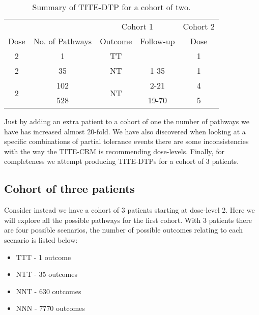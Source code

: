 \begin{table}[H]
	\centering
	\caption{Summary of TITE-DTP for a cohort of two.}
	\label{tab_tite-dtp:TITEDTP_c2_Sum}
	\begin{tabular}{ccccc}
		\hline
		\multicolumn{1}{l}{} &                 & \multicolumn{2}{c}{Cohort 1}    & Cohort 2 \\ 
		\cmidrule(l{3pt}r{3pt}){3-4} \cmidrule(l{3pt}r{3pt}){5-5}
		Dose                 & No. of Pathways & Outcome             & Follow-up & Dose     \\ \hline
		2                    & 1               & TT                  &           & 1        \\ \hline
		2                    & 35              & NT                  & 1-35      & 1        \\ \hline
		\multirow{2}{*}{2}   & 102             & \multirow{2}{*}{NT} & 2-21      & 4        \\
		& 528             &                     & 19-70     & 5        \\ \hline
	\end{tabular}
\end{table}

Just by adding an extra patient to a cohort of one the number of pathways we have has increased almost 20-fold. We have also discovered when looking at a specific combinations of partial tolerance events there are some inconsistencies with the way the TITE-CRM is recommending dose-levels. Finally, for completeness we attempt producing TITE-DTPs for a cohort of 3 patients.   


\subsection{Cohort of three patients}
Consider instead we have a cohort of 3 patients starting at dose-level 2. Here we will explore all the possible pathways for the first cohort. With 3 patients there are four possible scenarios, the number of possible outcomes relating to each scenario is listed below: 

\begin{itemize}
	\item TTT - 1 outcome 
	\item NTT - 35 outcomes 
	\item NNT - 630 outcomes 
	\item NNN - 7770 outcomes 
\end{itemize}

